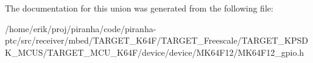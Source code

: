 The documentation for this union was generated from the following file\+:\begin{DoxyCompactItemize}
\item 
/home/erik/proj/piranha/code/piranha-\/ptc/src/receiver/mbed/\+T\+A\+R\+G\+E\+T\+\_\+\+K64\+F/\+T\+A\+R\+G\+E\+T\+\_\+\+Freescale/\+T\+A\+R\+G\+E\+T\+\_\+\+K\+P\+S\+D\+K\+\_\+\+M\+C\+U\+S/\+T\+A\+R\+G\+E\+T\+\_\+\+M\+C\+U\+\_\+\+K64\+F/device/device/\+M\+K64\+F12/M\+K64\+F12\+\_\+gpio.\+h\end{DoxyCompactItemize}
